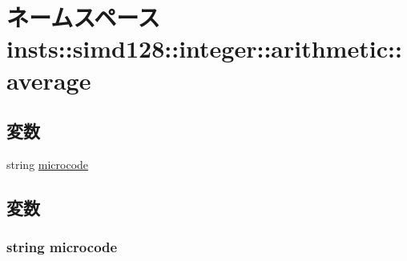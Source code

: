 \hypertarget{namespaceinsts_1_1simd128_1_1integer_1_1arithmetic_1_1average}{
\section{ネームスペース insts::simd128::integer::arithmetic::average}
\label{namespaceinsts_1_1simd128_1_1integer_1_1arithmetic_1_1average}
}
\subsection*{変数}
\begin{DoxyCompactItemize}
\item 
string \hyperlink{namespaceinsts_1_1simd128_1_1integer_1_1arithmetic_1_1average_a770f11a173e99389a8802f0107ed8f52}{microcode}
\end{DoxyCompactItemize}


\subsection{変数}
\hypertarget{namespaceinsts_1_1simd128_1_1integer_1_1arithmetic_1_1average_a770f11a173e99389a8802f0107ed8f52}{
\subsubsection[{microcode}]{\setlength{\rightskip}{0pt plus 5cm}string {\bf microcode}}}
\label{namespaceinsts_1_1simd128_1_1integer_1_1arithmetic_1_1average_a770f11a173e99389a8802f0107ed8f52}
